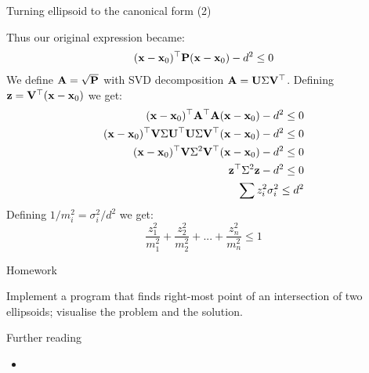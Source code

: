 \documentclass{beamer}
\begin{document}
\begin{frame}{Turning ellipsoid to the canonical form (2)}
	\begin{flushleft}
		
		Thus our original expression became:
		\begin{align}
			(\mathbf{x} - \mathbf{x}_0)^\top \mathbf{P}(\mathbf{x} - \mathbf{x}_0) - d^2 \leq 0
		\end{align}
		We define $\mathbf{A} = \sqrt{\mathbf{P}}$ with SVD decomposition $\mathbf{A} = \mathbf{U} \Sigma \mathbf{V}^\top$. Defining $\mathbf{z} = \mathbf{V}^\top (\mathbf{x} - \mathbf{x}_0)$ we get:
	\begin{align}
		(\mathbf{x} - \mathbf{x}_0)^\top \mathbf{A}^\top\mathbf{A}(\mathbf{x} - \mathbf{x}_0) - d^2 \leq 0 
		\\
		(\mathbf{x} - \mathbf{x}_0)^\top  \mathbf{V} \Sigma \mathbf{U}^\top  \mathbf{U} \Sigma \mathbf{V}^\top(\mathbf{x} - \mathbf{x}_0) - d^2 \leq 0 
		\\
		(\mathbf{x} - \mathbf{x}_0)^\top  \mathbf{V} \Sigma^2 \mathbf{V}^\top(\mathbf{x} - \mathbf{x}_0) - d^2 \leq 0
		\\
		\mathbf{z}^\top   \Sigma^2 \mathbf{z} - d^2 \leq 0
		\\
		\sum z_i^2 \sigma_i^2  \leq d^2
	\end{align}
%
Defining $1/m_i^2 = \sigma_i^2 / d^2$ we get:
%
\begin{equation}
	\frac{z_1^2}{m_1^2} + \frac{z_2^2}{m_2^2} + ... + 
	\frac{z_n^2}{m_n^2} \leq 1
\end{equation}
		
	\end{flushleft}
\end{frame}





\begin{frame}{Homework}
\begin{flushleft}

Implement a program that finds right-most point of an intersection of two ellipsoids; visualise the problem and the solution.

\end{flushleft}
\end{frame}



\begin{frame}{Further reading}
	\begin{flushleft}
		
		\begin{itemize}
			\item {}
			
			
		\end{itemize}
		
		
	\end{flushleft}
\end{frame}


\myqrframe
\end{document}
